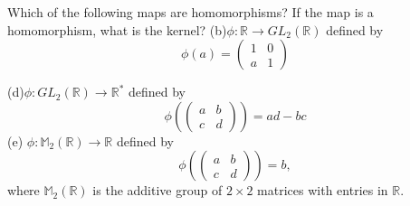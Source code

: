 \documentclass[a4paper, justified]{tufte-handout}
\begin{document}
\begin{problem}[TJ 11-2(b,d,e)]
Which of the following maps are homomorphisms? If the map is a homomorphism,
what is the kernel?
(b)$\phi: \mathbb{R} \rightarrow G L_2(\mathbb{R})$ defined by
$$
	\phi(a)=\left(\begin{array}{ll}
			1 & 0 \\
			a & 1
		\end{array}\right)
$$

(d)$\phi: G L_2(\mathbb{R}) \rightarrow \mathbb{R}^*$ defined by
$$
	\phi\left(\left(\begin{array}{ll}
				a & b \\
				c & d
			\end{array}\right)\right)=a d-b c
$$
(e)
$\phi: \mathbb{M}_2(\mathbb{R}) \rightarrow \mathbb{R}$ defined by
$$
	\phi\left(\left(\begin{array}{ll}
				a & b \\
				c & d
			\end{array}\right)\right)=b,
$$
where $\mathbb{M}_2(\mathbb{R})$ is the additive group of $2 \times 2$ matrices with entries in $\mathbb{R}$.
\end{problem}
\end{document}
